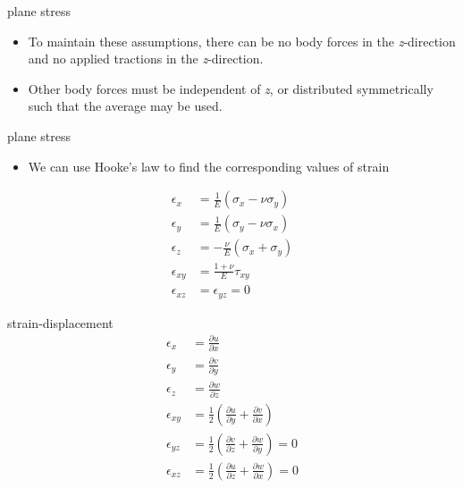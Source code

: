 \documentclass[
  letterpaper,
  ignorenonframetext,
  aspectratio=43,
  handout,
  12pt]{beamer}
\providecommand{\tightlist}{%
  \setlength{\itemsep}{0pt}\setlength{\parskip}{0pt}}
\providecommand{\tightlist}{%
\setlength{\itemsep}{0pt}\setlength{\parskip}{0pt}}
\begin{document}
\begin{frame}{plane stress}
\protect\hypertarget{plane-stress-2}{}
\begin{itemize}
\tightlist
\item
  To maintain these assumptions, there can be no body forces in the
  \emph{z}-direction and no applied tractions in the \emph{z}-direction.
\item
  Other body forces must be independent of \emph{z}, or distributed
  symmetrically such that the average may be used.
\end{itemize}
\end{frame}

\begin{frame}{plane stress}
\protect\hypertarget{plane-stress-3}{}
\begin{itemize}
\tightlist
\item
  We can use Hooke's law to find the corresponding values of strain
\end{itemize}

\[\begin{aligned}
    \epsilon_x &= \frac{1}{E}(\sigma_x - \nu \sigma_y)\\
    \epsilon_y &= \frac{1}{E}(\sigma_y - \nu \sigma_x)\\
    \epsilon_z &= -\frac{\nu}{E}(\sigma_x + \sigma_y)\\
    \epsilon_{xy} &= \frac{1+\nu}{E}\tau_{xy}\\
    \epsilon_{xz} &= \epsilon_{yz} = 0
\end{aligned}\]
\end{frame}

\begin{frame}{strain-displacement}
\protect\hypertarget{strain-displacement}{}
\[\begin{aligned}
    \epsilon_{x} &= \frac{\partial u}{\partial x}\\
    \epsilon_{y} &= \frac{\partial v}{\partial y}\\
    \epsilon_{z} &= \frac{\partial w}{\partial z}\\
    \epsilon_{xy} &= \frac{1}{2}\left(\frac{\partial u}{\partial y} + \frac{\partial v}{\partial x}\right)\\
    \epsilon_{yz} &= \frac{1}{2}\left(\frac{\partial v}{\partial z} + \frac{\partial w}{\partial y}\right) = 0\\
    \epsilon_{xz} &= \frac{1}{2}\left(\frac{\partial u}{\partial z} + \frac{\partial w}{\partial x}\right) = 0\\
\end{aligned}\]
\end{frame}
\end{document}
